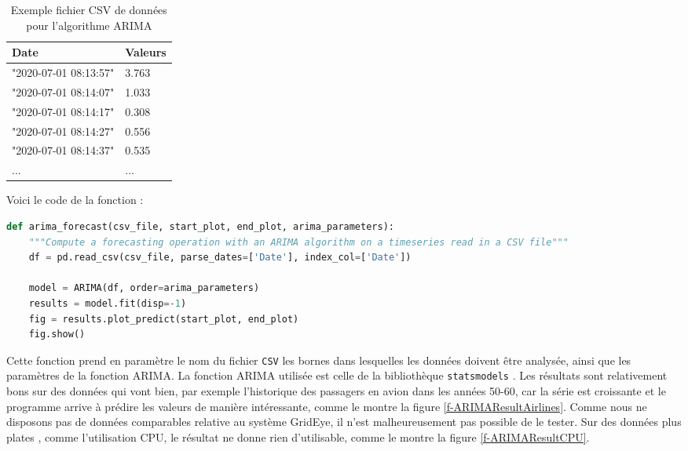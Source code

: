\documentclass[paper=a4, fontsize=11pt]{scrartcl}
\begin{document}
\begin{table}[H]
\centering
\begin{tabular}{ |m{4cm}|m{4cm}|  }
    \hline
    Date & Valeurs \\
    \hline
    "2020-07-01 08:13:57" & 3.763 \\
    \hline
    "2020-07-01 08:14:07" & 1.033 \\
    \hline
    "2020-07-01 08:14:17" & 0.308 \\
    \hline
    "2020-07-01 08:14:27" & 0.556 \\
    \hline
    "2020-07-01 08:14:37" & 0.535 \\
    \hline
    ... & ... \\
    \hline
\end{tabular}
\caption{Exemple fichier CSV de données pour l'algorithme ARIMA}
\label{t-ExempleCSVARIMA}
\end{table}

Voici le code de la fonction : \cite{noauthor_modearima_2020}

\begin{lstlisting}[language=python]
def arima_forecast(csv_file, start_plot, end_plot, arima_parameters):
    """Compute a forecasting operation with an ARIMA algorithm on a timeseries read in a CSV file"""
    df = pd.read_csv(csv_file, parse_dates=['Date'], index_col=['Date'])

    model = ARIMA(df, order=arima_parameters)
    results = model.fit(disp=-1)
    fig = results.plot_predict(start_plot, end_plot)
    fig.show()
\end{lstlisting}

Cette fonction prend en paramètre le nom du fichier \verb,CSV, les bornes dans lesquelles les données doivent être analysée, ainsi que les paramètres de la fonction ARIMA. La fonction ARIMA utilisée est celle de la bibliothèque \verb,statsmodels, \cite{noauthor_introduction_nodate}.
Les résultats sont relativement bons sur des données qui vont bien, par exemple l'historique des passagers en avion dans les années 50-60, car la série est croissante et le programme arrive à prédire les valeurs de manière intéressante, comme le montre la figure \ref{f-ARIMAResultAirlines}. Comme nous ne disposons pas de données comparables relative au système GridEye, il n'est malheureusement pas possible de le tester. Sur des données plus \og plates \fg, comme l'utilisation CPU, le résultat ne donne rien d'utilisable, comme le montre la figure \ref{f-ARIMAResultCPU}.
\end{document}
